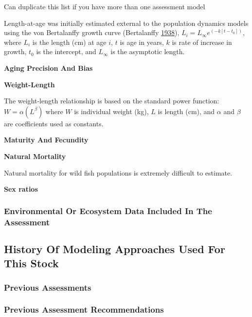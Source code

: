 \documentclass[12pt,]{article}
\begin{document}
Can duplicate this list if you have more than one assessment model

Length-at-age was initially estimated external to the population
dynamics models using the von Bertalanffy growth curve (Bertalanffy
\protect\hyperlink{ref-vonB1938}{1938}),
\(L_i = L_{\infty}e^{(-k[t-t_0])}\), where \(L_i\) is the length (cm) at
age \(i\), \(t\) is age in years, \(k\) is rate of increase in growth,
\(t_0\) is the intercept, and \(L_{\infty}\) is the asymptotic length.

\vspace{.5cm} \textbf{Aging Precision And Bias}

\vspace{.5cm} \textbf{Weight-Length}

The weight-length relationship is based on the standard power function:
\(W = \alpha(L^\beta)\) where \(W\) is individual weight (kg), \(L\) is
length (cm), and \(\alpha\) and \(\beta\) are coefficients used as
constants.

\vspace{.5cm} \textbf{Maturity And Fecundity}

\vspace{.5cm} \textbf{Natural Mortality}

Natural mortality for wild fish populations is extremely difficult to
estimate.

\vspace{.5cm} \textbf{Sex ratios}

\subsubsection{Environmental Or Ecosystem Data Included In The
Assessment}\label{environmental-or-ecosystem-data-included-in-the-assessment}

\subsection{History Of Modeling Approaches Used For This
Stock}\label{history-of-modeling-approaches-used-for-this-stock}

\subsubsection{Previous Assessments}\label{previous-assessments}

\subsubsection{Previous Assessment
Recommendations}\label{previous-assessment-recommendations}
\end{document}
